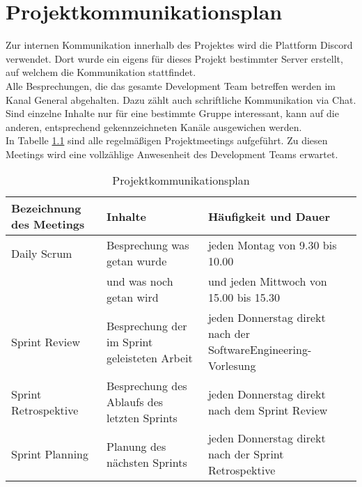 \chapter{Projektkommunikationsplan}

Zur internen Kommunikation innerhalb des Projektes wird die Plattform Discord verwendet. Dort wurde ein eigens für dieses Projekt bestimmter Server erstellt, auf welchem die Kommunikation stattfindet. \\
Alle Besprechungen, die das gesamte \gls{Development Team} betreffen werden im Kanal \glqq General\grqq\: abgehalten. Dazu zählt auch schriftliche Kommunikation via Chat. \\
Sind einzelne Inhalte nur für eine bestimmte Gruppe interessant, kann auf die anderen, entsprechend gekennzeichneten Kanäle ausgewichen werden. \\
In Tabelle \ref{tab:Kommunikation} sind alle regelmäßigen Projektmeetings aufgeführt. Zu diesen Meetings wird eine vollzählige Anwesenheit des \gls{Development Team}s erwartet.

\begin{table}[h]
\centering
\tiny
\begin{tabularx}{\textwidth}{|l|l|X|} 
\hline
Bezeichnung des Meetings & Inhalte & Häufigkeit und Dauer \\
\hline
\gls{Daily Scrum} & Besprechung was getan wurde & jeden Montag von 9.30 bis 10.00\\
\quad & und was noch getan wird & und jeden Mittwoch von 15.00 bis 15.30 \\
\hline
\gls{Sprint Review} & Besprechung der im Sprint geleisteten Arbeit & jeden Donnerstag direkt nach der SoftwareEngineering-Vorlesung\\
\hline
\gls{Sprint Retrospektive} & Besprechung des Ablaufs des letzten Sprints & jeden Donnerstag direkt nach dem \gls{Sprint Review}\\
\hline
\gls{Sprint Planning} & Planung des nächsten Sprints & jeden Donnerstag direkt nach der \gls{Sprint Retrospektive}\\
\hline
\end{tabularx}
\caption{Projektkommunikationsplan}
\label{tab:Kommunikation}
\end{table}
